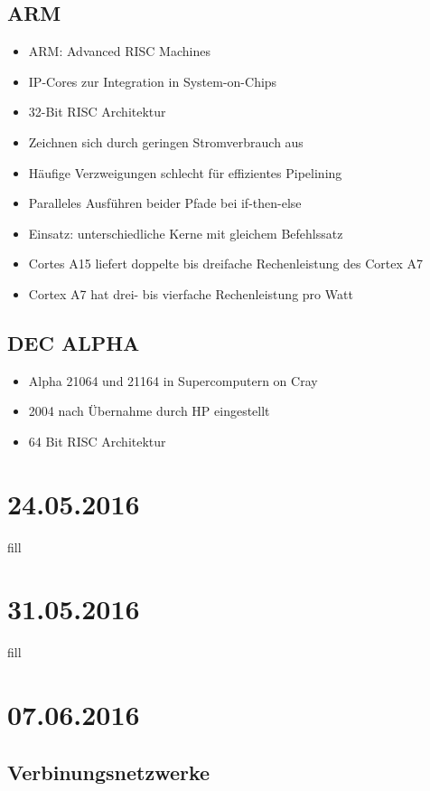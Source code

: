 \subsection{ARM}
\begin{itemize}
	\item ARM: Advanced RISC Machines
	\item IP-Cores zur Integration in System-on-Chips
	\item 32-Bit RISC Architektur
	\item Zeichnen sich durch geringen Stromverbrauch aus
	\item Häufige Verzweigungen schlecht für effizientes Pipelining
	\item Paralleles Ausführen beider Pfade bei if-then-else
	\item Einsatz: unterschiedliche Kerne mit gleichem Befehlssatz
	\item Cortes A15 liefert doppelte bis dreifache Rechenleistung des Cortex A7
	\item Cortex A7 hat drei- bis vierfache Rechenleistung pro Watt
\end{itemize}
\subsection{DEC ALPHA}
\begin{itemize}
	\item Alpha 21064 und 21164 in Supercomputern on Cray
	\item 2004 nach Übernahme durch HP eingestellt
	\item 64 Bit RISC Architektur
\end{itemize}
\section{24.05.2016}
fill
\section{31.05.2016}
fill
\section{07.06.2016}
\subsection{Verbinungsnetzwerke}
